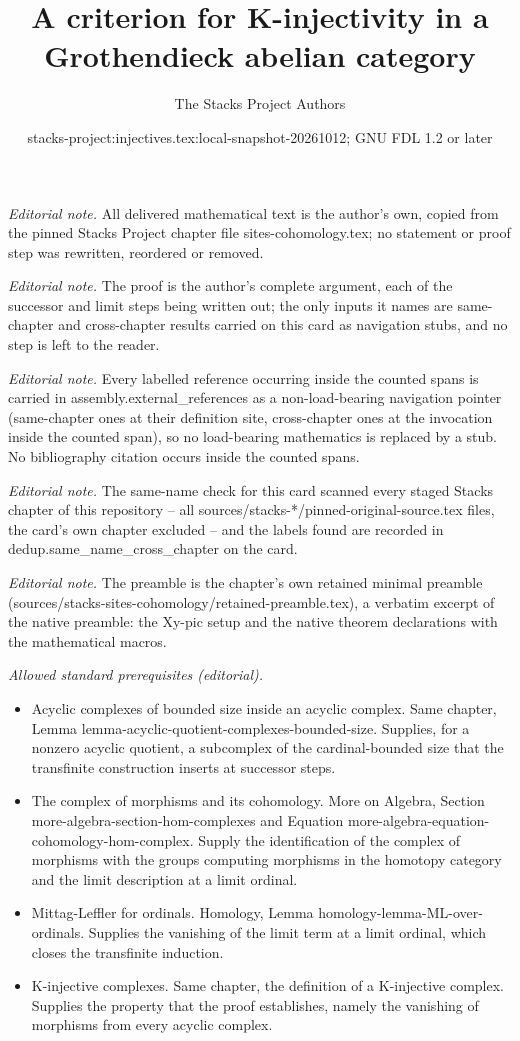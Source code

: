 \documentclass[10pt,a4paper]{amsart}
\title{A criterion for K-injectivity in a Grothendieck abelian category}
\author{The Stacks Project Authors}
\date{stacks-project:injectives.tex:local-snapshot-20261012; GNU FDL 1.2 or later}
\theoremstyle{plain}
\theoremstyle{definition}
\theoremstyle{remark}
\numberwithin{equation}{subsection}
\begin{document}
\maketitle
\noindent\textit{Editorial note.} All delivered mathematical text is the author's own, copied from the pinned Stacks Project chapter file sites-cohomology.tex; no statement or proof step was rewritten, reordered or removed.\par\medskip
\noindent\textit{Editorial note.} The proof is the author's complete argument, each of the successor and limit steps being written out; the only inputs it names are same-chapter and cross-chapter results carried on this card as navigation stubs, and no step is left to the reader.\par\medskip
\noindent\textit{Editorial note.} Every labelled reference occurring inside the counted spans is carried in assembly.external\_references as a non-load-bearing navigation pointer (same-chapter ones at their definition site, cross-chapter ones at the invocation inside the counted span), so no load-bearing mathematics is replaced by a stub. No bibliography citation occurs inside the counted spans.\par\medskip
\noindent\textit{Editorial note.} The same-name check for this card scanned every staged Stacks chapter of this repository -- all sources/stacks-*/pinned-original-source.tex files, the card's own chapter excluded -- and the labels found are recorded in dedup.same\_name\_cross\_chapter on the card.\par\medskip
\noindent\textit{Editorial note.} The preamble is the chapter's own retained minimal preamble (sources/stacks-sites-cohomology/retained-preamble.tex), a verbatim excerpt of the native preamble: the Xy-pic setup and the native theorem declarations with the mathematical macros.\par\medskip
\noindent\textit{Allowed standard prerequisites (editorial).}\begin{itemize}
\item Acyclic complexes of bounded size inside an acyclic complex. Same chapter, Lemma lemma-acyclic-quotient-complexes-bounded-size. Supplies, for a nonzero acyclic quotient, a subcomplex of the cardinal-bounded size that the transfinite construction inserts at successor steps.
\item The complex of morphisms and its cohomology. More on Algebra, Section more-algebra-section-hom-complexes and Equation more-algebra-equation-cohomology-hom-complex. Supply the identification of the complex of morphisms with the groups computing morphisms in the homotopy category and the limit description at a limit ordinal.
\item Mittag-Leffler for ordinals. Homology, Lemma homology-lemma-ML-over-ordinals. Supplies the vanishing of the limit term at a limit ordinal, which closes the transfinite induction.
\item K-injective complexes. Same chapter, the definition of a K-injective complex. Supplies the property that the proof establishes, namely the vanishing of morphisms from every acyclic complex.
\end{itemize}\medskip
\end{document}
